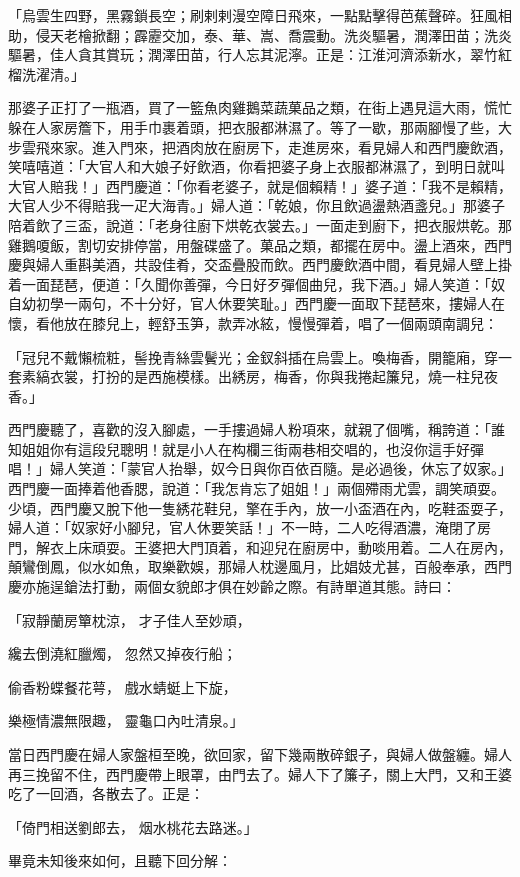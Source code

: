 \begin{showcontents}{}
「烏雲生四野，黑霧鎖長空；刷剌剌漫空障日飛來，一點點擊得芭蕉聲碎。狂風相助，侵天老檜掀翻；霹靂交加，泰、華、嵩、喬震動。洗炎驅暑，潤澤田苗；洗炎驅暑，佳人貪其賞玩；潤澤田苗，行人忘其泥濘。正是：江淮河濟添新水，翠竹紅榴洗濯清。」

那婆子正打了一瓶酒，買了一籃魚肉雞鵝菜蔬菓品之類，在街上遇見這大雨，慌忙躲在人家房簷下，用手巾裹着頭，把衣服都淋濕了。等了一歇，那兩腳慢了些，大步雲飛來家。進入門來，把酒肉放在廚房下，走進房來，看見婦人和西門慶飲酒，笑嘻嘻道：「大官人和大娘子好飲酒，你看把婆子身上衣服都淋濕了，到明日就叫大官人賠我！」西門慶道：「你看老婆子，就是個賴精！」婆子道：「我不是賴精，大官人少不得賠我一疋大海青。」婦人道：「乾娘，你且飲過盪熱酒盞兒。」那婆子陪着飲了三盃，說道：「老身往廚下烘乾衣裳去。」一面走到廚下，把衣服烘乾。那雞鵝嗄飯，割切安排停當，用盤碟盛了。菓品之類，都擺在房中。盪上酒來，西門慶與婦人重斟美酒，共設佳肴，交盃疊股而飲。西門慶飲酒中間，看見婦人壁上掛着一面琵琶，便道：「久聞你善彈，今日好歹彈個曲兒，我下酒。」婦人笑道：「奴自幼初學一兩句，不十分好，官人休要笑耻。」西門慶一面取下琵琶來，摟婦人在懷，看他放在膝兒上，輕舒玉笋，款弄冰絃，慢慢彈着，唱了一個兩頭南調兒：

「冠兒不戴懶梳粧，髻挽青絲雲鬢光；金釵斜插在烏雲上。喚梅香，開籠廂，穿一套素縞衣裳，打扮的是西施模樣。出綉房，梅香，你與我捲起簾兒，燒一柱兒夜香。」

西門慶聽了，喜歡的沒入腳處，一手摟過婦人粉項來，就親了個嘴，稱誇道：「誰知姐姐你有這段兒聰明！就是小人在构欄三街兩巷相交唱的，也沒你這手好彈唱！」婦人笑道：「蒙官人抬舉，奴今日與你百依百隨。是必過後，休忘了奴家。」西門慶一面捧着他香腮，說道：「我怎肯忘了姐姐！」兩個殢雨尤雲，調笑頑耍。少頃，西門慶又脫下他一隻綉花鞋兒，擎在手內，放一小盃酒在內，吃鞋盃耍子，婦人道：「奴家好小腳兒，官人休要笑話！」不一時，二人吃得酒濃，淹閉了房門，解衣上床頑耍。王婆把大門頂着，和迎兒在廚房中，動啖用着。二人在房內，顛鸞倒鳳，似水如魚，取樂歡娛，那婦人枕邊風月，比娼妓尤甚，百般奉承，西門慶亦施逞鎗法打動，兩個女貌郎才俱在妙齡之際。有詩單道其態。詩曰：

「寂靜蘭房簞枕涼，  才子佳人至妙頑，

纔去倒澆紅臘燭，  忽然又掉夜行船；

偷香粉蝶餐花萼，  戲水蜻蜓上下旋，

樂極情濃無限趣，  靈龜口內吐清泉。」

當日西門慶在婦人家盤桓至晚，欲回家，留下幾兩散碎銀子，與婦人做盤纏。婦人再三挽留不住，西門慶帶上眼罩，由門去了。婦人下了簾子，關上大門，又和王婆吃了一回酒，各散去了。正是：

「倚門相送劉郎去，  烟水桃花去路迷。」

畢竟未知後來如何，且聽下回分解：



\end{showcontents}
